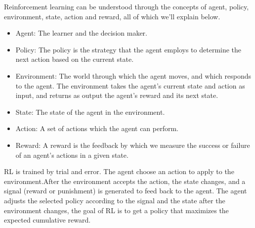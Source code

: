 \documentclass[journal]{IEEEtran}
\begin{document}
Reinforcement learning can be understood through the concepts of agent, policy, environment, state, action and reward, all of which we’ll explain below.
% 
\begin{itemize}
    \item Agent: The learner and the decision maker.
    \item Policy: The policy is the strategy that the agent employs to determine the next action based on the current state.
    \item Environment: The world through which the agent moves, and which responds to the agent. The environment takes the agent’s current state and action as input, and returns as output the agent’s reward and its next state.
    \item State: The state of the agent in the environment.
    \item Action: A set of actions which the agent can perform.
    \item Reward: A reward is the feedback by which we measure the success or failure of an agent’s actions in a given state.
\end{itemize}

RL is trained by trial and error. The agent choose an action to apply to the environment.After the environment accepts the action, the state changes, and a signal (reward or punishment) is generated to feed back to the agent. The agent adjusts the selected policy according to the signal and the state after the environment changes, the goal of RL is to get a policy that maximizes the expected cumulative reward.
% 
\end{document}
